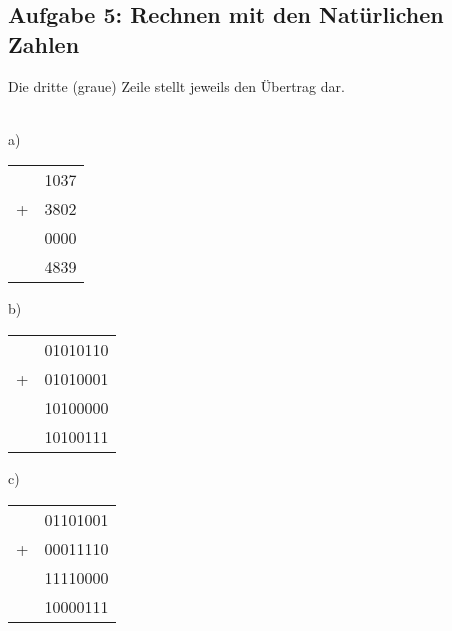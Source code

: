 \documentclass{article}
\begin{document}
    \subsection*{Aufgabe 5: Rechnen mit den Natürlichen Zahlen}
    Die dritte (graue) Zeile stellt jeweils den Übertrag dar. \\\\
    \begin{minipage}[t]{0.2\textwidth}
        a) \hfill\\
        \begin{tabular}{cr}
            &1037	\\
           +&3802	\\
            &\color{gray}0000  \\
            \hline
            &4839
       \end{tabular}
    \end{minipage}
    \begin{minipage}[t]{0.2\textwidth}
        b) \hfill\\
        \begin{tabular}{cr}
            &01010110	\\
           +&01010001	\\
            &\color{gray}10100000  \\
            \hline
            &10100111
       \end{tabular}
    \end{minipage}
    \begin{minipage}[t]{0.2\textwidth}
        c) \hfill\\
        \begin{tabular}{cr}
            &01101001	\\
           +&00011110	\\
            &\color{gray}11110000  \\
            \hline
            &10000111
       \end{tabular}
    \end{minipage}
\end{document}

